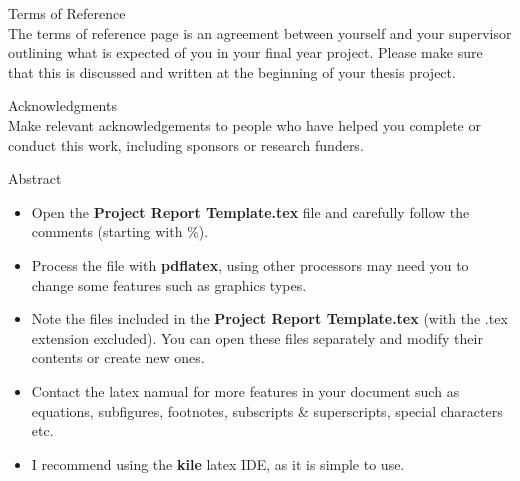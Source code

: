 \documentclass[a4paper,12pt]{report}
\begin{document}
{\newpage
    {\Huge Terms of Reference}\\
    \vskip 10mm
    The terms of reference page is an agreement between yourself and your supervisor outlining what is expected of you in your final year project. Please make sure that this is discussed and written at the beginning of your thesis project. 


\newpage
{\Huge Acknowledgments}\\
\vskip 10mm
Make relevant acknowledgements to people who have helped you complete or conduct this work, including sponsors or research funders.


\newpage
    {\Huge Abstract}\\
    \vskip 10mm

    \begin{itemize}
        \item Open the {\bf Project Report Template.tex} file and carefully follow the comments (starting with \%).
        \item Process the file with {\bf pdflatex}, using other processors may need you to change some features such as graphics types.
        \item Note the files included in the  {\bf Project Report Template.tex} (with the {.tex} extension excluded). You can open these files separately and modify their contents 
        or create new ones.
        \item Contact the latex namual for more features in your document such as equations, subfigures, footnotes, subscripts \& superscripts, special characters etc.
        \item I recommend using the {\bf kile} latex IDE, as it is simple to use.
    \end{itemize}


\newpage
    \tableofcontents



\newpage
\fancyhead[RE,LO]{}
\fancyhead[LE]{\leftmark}
\fancyhead[RO]{\rightmark}
\pagestyle{fancy}










\appendix


}
\end{document}
